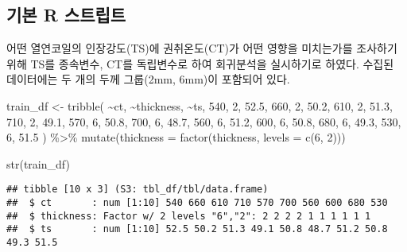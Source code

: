 \documentclass[
]{book}
\newenvironment{Shaded}{\begin{snugshade}}{\end{snugshade}}
\newcommand{\AttributeTok}[1]{\textcolor[rgb]{0.77,0.63,0.00}{#1}}
\newcommand{\DecValTok}[1]{\textcolor[rgb]{0.00,0.00,0.81}{#1}}
\newcommand{\FloatTok}[1]{\textcolor[rgb]{0.00,0.00,0.81}{#1}}
\newcommand{\FunctionTok}[1]{\textcolor[rgb]{0.00,0.00,0.00}{#1}}
\newcommand{\NormalTok}[1]{#1}
\newcommand{\OtherTok}[1]{\textcolor[rgb]{0.56,0.35,0.01}{#1}}
\newcommand{\SpecialCharTok}[1]{\textcolor[rgb]{0.00,0.00,0.00}{#1}}
\begin{document}
\hypertarget{regression-indicator-variable-basic-script}{%
\subsection{기본 R 스트립트}\label{regression-indicator-variable-basic-script}}

어떤 열연코일의 인장강도(TS)에 권취온도(CT)가 어떤 영향을 미치는가를 조사하기 위해 TS를 종속변수, CT를 독립변수로 하여 회귀분석을 실시하기로 하였다. 수집된 데이터에는 두 개의 두께 그룹(2mm, 6mm)이 포함되어 있다.

\begin{Shaded}
\begin{Highlighting}[]
\NormalTok{train\_df }\OtherTok{\textless{}{-}} \FunctionTok{tribble}\NormalTok{(}
  \SpecialCharTok{\textasciitilde{}}\NormalTok{ct, }\SpecialCharTok{\textasciitilde{}}\NormalTok{thickness, }\SpecialCharTok{\textasciitilde{}}\NormalTok{ts,}
  \DecValTok{540}\NormalTok{, }\DecValTok{2}\NormalTok{, }\FloatTok{52.5}\NormalTok{,}
  \DecValTok{660}\NormalTok{, }\DecValTok{2}\NormalTok{, }\FloatTok{50.2}\NormalTok{,}
  \DecValTok{610}\NormalTok{, }\DecValTok{2}\NormalTok{, }\FloatTok{51.3}\NormalTok{,}
  \DecValTok{710}\NormalTok{, }\DecValTok{2}\NormalTok{, }\FloatTok{49.1}\NormalTok{,}
  \DecValTok{570}\NormalTok{, }\DecValTok{6}\NormalTok{, }\FloatTok{50.8}\NormalTok{,}
  \DecValTok{700}\NormalTok{, }\DecValTok{6}\NormalTok{, }\FloatTok{48.7}\NormalTok{,}
  \DecValTok{560}\NormalTok{, }\DecValTok{6}\NormalTok{, }\FloatTok{51.2}\NormalTok{,}
  \DecValTok{600}\NormalTok{, }\DecValTok{6}\NormalTok{, }\FloatTok{50.8}\NormalTok{,}
  \DecValTok{680}\NormalTok{, }\DecValTok{6}\NormalTok{, }\FloatTok{49.3}\NormalTok{,}
  \DecValTok{530}\NormalTok{, }\DecValTok{6}\NormalTok{, }\FloatTok{51.5}
\NormalTok{) }\SpecialCharTok{\%\textgreater{}\%}
  \FunctionTok{mutate}\NormalTok{(}\AttributeTok{thickness =} \FunctionTok{factor}\NormalTok{(thickness, }\AttributeTok{levels =} \FunctionTok{c}\NormalTok{(}\DecValTok{6}\NormalTok{, }\DecValTok{2}\NormalTok{)))}
\end{Highlighting}
\end{Shaded}

\begin{Shaded}
\begin{Highlighting}[]
\FunctionTok{str}\NormalTok{(train\_df)}
\end{Highlighting}
\end{Shaded}

\begin{verbatim}
## tibble [10 x 3] (S3: tbl_df/tbl/data.frame)
##  $ ct       : num [1:10] 540 660 610 710 570 700 560 600 680 530
##  $ thickness: Factor w/ 2 levels "6","2": 2 2 2 2 1 1 1 1 1 1
##  $ ts       : num [1:10] 52.5 50.2 51.3 49.1 50.8 48.7 51.2 50.8 49.3 51.5
\end{verbatim}
\end{document}
